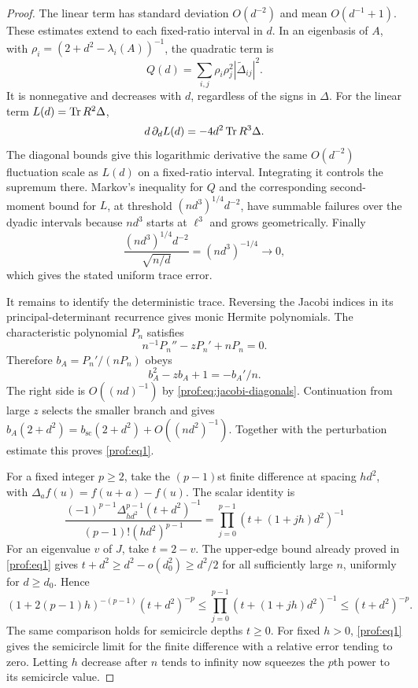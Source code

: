 \begin{proof}
The linear
term has standard deviation $O(d^{-2})$ and mean $O(d^{-1}+1)$.
These estimates extend to each fixed-ratio interval in $d$. In an
eigenbasis of $A$, with $\rho_i=(2+d^2-\lambda_i(A))^{-1}$, the quadratic
term is
\[
 Q(d)=\sum_{i,j}\rho_i\rho_j^2|\widetilde\Delta_{ij}|^2.
\]
It is nonnegative and decreases with $d$, regardless of the signs in
$\Delta$. For the linear term $L(d)=\operatorname{Tr} R^2\Delta$,
\[
 d\,\partial_d L(d)=-4d^2\operatorname{Tr} R^3\Delta.
\]
The diagonal bounds give this logarithmic derivative the same
$O(d^{-2})$ fluctuation scale as $L(d)$ on a fixed-ratio interval.
Integrating it controls the supremum there. Markov's inequality for
$Q$ and the corresponding second-moment bound for $L$, at threshold
$(nd^3)^{1/4}d^{-2}$, have summable failures over the dyadic intervals
because $nd^3$ starts at $\ell^3$ and grows geometrically. Finally
\[
 \frac{(nd^3)^{1/4}d^{-2}}{\sqrt{n/d}}
 =(nd^3)^{-1/4}\longrightarrow0,
\]
which gives the stated uniform trace error.

It remains to identify the deterministic trace.  Reversing the Jacobi
indices in its principal-determinant recurrence gives monic Hermite
polynomials.  The characteristic polynomial $P_n$ satisfies
\[
 n^{-1}P_n''-zP_n'+nP_n=0.
\]
Therefore $b_A=P_n'/(nP_n)$ obeys
\[
 b_A^2-zb_A+1=-b_A'/n.
\]
The right side is $O((nd)^{-1})$ by
\eqref{prof:eq:jacobi-diagonals}.  Continuation from large $z$ selects
the smaller branch and gives
$b_A(2+d^2)=b_{\mathrm{sc}}(2+d^2)+O((nd^2)^{-1})$.
Together with the perturbation estimate this proves
\eqref{prof:eq1}.

For a fixed integer $p\ge2$, take the $(p-1)$st finite difference at
spacing $hd^2$, with $\Delta_a f(u)=f(u+a)-f(u)$. The scalar identity is
\[
 \frac{(-1)^{p-1}\Delta_{hd^2}^{p-1}(t+d^2)^{-1}}
 {(p-1)!(hd^2)^{p-1}}
 =\prod_{j=0}^{p-1}(t+(1+jh)d^2)^{-1}
\]
For an eigenvalue $v$ of $J$, take $t=2-v$. The upper-edge bound
already proved in \eqref{prof:eq1} gives
$t+d^2\ge d^2-o(d_0^2)\ge d^2/2$ for all sufficiently large $n$,
uniformly for $d\ge d_0$. Hence
\[
 (1+2(p-1)h)^{-(p-1)}(t+d^2)^{-p}
 \le \prod_{j=0}^{p-1}(t+(1+jh)d^2)^{-1}
 \le (t+d^2)^{-p}.
\]
The same comparison holds for semicircle depths $t\ge0$. For fixed
$h>0$, \eqref{prof:eq1} gives the semicircle limit for the finite
difference with a relative error tending to zero. Letting $h$ decrease
after $n$ tends to infinity now squeezes the $p$th power to its
semicircle value.


\end{proof}
